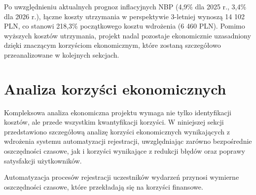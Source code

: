 Po uwzględnieniu aktualnych prognoz inflacyjnych NBP (4,9\% dla 2025 r., 3,4\% dla 2026 r.), łączne koszty utrzymania w perspektywie 3-letniej wynoszą 14 102 PLN, co stanowi 218,3\% początkowego kosztu wdrożenia (6 460 PLN). Pomimo wyższych kosztów utrzymania, projekt nadal pozostaje ekonomicznie uzasadniony dzięki znaczącym korzyściom ekonomicznym, które zostaną szczegółowo przeanalizowane w kolejnych sekcjach.

\section{Analiza korzyści ekonomicznych}

Kompleksowa analiza ekonomiczna projektu wymaga nie tylko identyfikacji kosztów, ale przede wszystkim kwantyfikacji korzyści. W niniejszej sekcji przedstawiono szczegółową analizę korzyści ekonomicznych wynikających z wdrożenia systemu automatyzacji rejestracji, uwzględniając zarówno bezpośrednie oszczędności czasowe, jak i korzyści wynikające z redukcji błędów oraz poprawy satysfakcji użytkowników.

Automatyzacja procesów rejestracji uczestników wydarzeń przynosi wymierne oszczędności czasowe, które przekładają się na korzyści finansowe.

